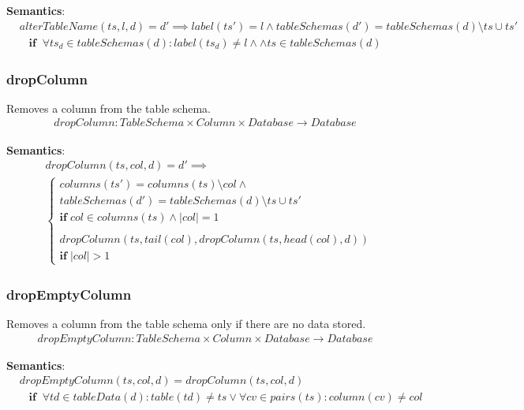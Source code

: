 \documentclass[10pt]{article}
\begin{document}
\noindent \textbf{Semantics}:
\begin{align}
& alterTableName(ts, l, d) = d' \implies label(ts') = l \land tableSchemas(d') = tableSchemas(d) \setminus ts \cup ts'  \nonumber \\
& \;\;\; \mathbf{if}  \;\;  \forall ts_d \in tableSchemas(d) : label(ts_d) \neq l \land \land ts \in tableSchemas(d) 
\end{align}

\subsubsection{dropColumn}
Removes a column from the table schema.
\begin{align}
dropColumn: TableSchema \times Column \times Database \rightarrow Database
\end{align}

\noindent \textbf{Semantics}:
\begin{align}
& dropColumn(ts, col, d) = d' \implies \\
& \begin{cases}
 columns(ts') = columns(ts) \setminus col \land \nonumber \\
     tableSchemas(d') = tableSchemas(d) \setminus ts \cup ts'  \nonumber \\
 \mathbf{if}  \; col \in columns(ts) \land |col| = 1
 \\\\
 dropColumn(ts, tail(col), dropColumn(ts, head(col), d)) \\
 \mathbf{if} \; |col| > 1
 \end{cases}
\end{align}

\subsubsection{dropEmptyColumn}
Removes a column from the table schema only if there are no data stored.
\begin{align}
dropEmptyColumn: TableSchema \times Column \times Database \rightarrow Database
\end{align}

\noindent \textbf{Semantics}:
\begin{align}
& dropEmptyColumn(ts, col, d) = dropColumn(ts, col, d)  \nonumber \\
& \;\;\; \mathbf{if}  \;\; \forall td \in tableData(d) : table(td) \neq ts \lor \forall cv \in pairs(ts) : column(cv) \neq col
\end{align}
\end{document}
